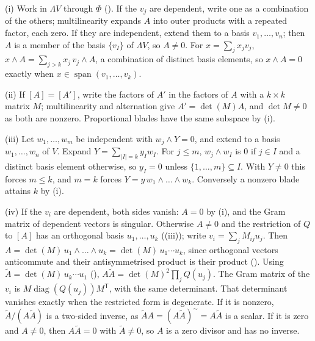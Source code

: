 (i) Work in $\Lambda V$ through $\Phi$ (). If the $v_j$ are dependent, write one as a combination of the others; multilinearity expands $A$ into outer products with a repeated factor, each zero. If they are independent, extend them to a basis $v_1, \dots, v_n$; then $A$ is a member of the basis $\{v_I\}$ of $\Lambda V$, so $A \ne 0$. For $x = \sum_j x_j v_j$, $x \wedge A = \sum_{j > k} x_j\, v_j \wedge A$, a combination of distinct basis elements, so $x \wedge A = 0$ exactly when $x \in \operatorname{span}(v_1, \dots, v_k)$.

(ii) If $[A] = [A']$, write the factors of $A'$ in the factors of $A$ with a $k \times k$ matrix $M$; multilinearity and alternation give $A' = \det(M) A$, and $\det M \ne 0$ as both are nonzero. Proportional blades have the same subspace by (i).

(iii) Let $w_1, \dots, w_m$ be independent with $w_j \wedge Y = 0$, and extend to a basis $w_1, \dots, w_n$ of $V$. Expand $Y = \sum_{|I| = k} y_I w_I$. For $j \le m$, $w_j \wedge w_I$ is $0$ if $j \in I$ and a distinct basis element otherwise, so $y_I = 0$ unless $\{1, \dots, m\} \subseteq I$. With $Y \ne 0$ this forces $m \le k$, and $m = k$ forces $Y = y\, w_1 \wedge \dots \wedge w_k$. Conversely a nonzero blade attains $k$ by (i).

(iv) If the $v_i$ are dependent, both sides vanish: $A = 0$ by (i), and the Gram matrix of dependent vectors is singular. Otherwise $A \ne 0$ and the restriction of $Q$ to $[A]$ has an orthogonal basis $u_1, \dots, u_k$ ((iii)); write $v_i = \sum_j M_{ij} u_j$. Then $A = \det(M)\, u_1 \wedge \dots \wedge u_k = \det(M)\, u_1 \cdots u_k$, since orthogonal vectors anticommute and their antisymmetrised product is their product (). Using $\tilde{A} = \det(M)\, u_k \cdots u_1$ (), $A \tilde{A} = \det(M)^{2} \prod_j Q(u_j)$. The Gram matrix of the $v_i$ is $M \operatorname{diag}(Q(u_j)) M^{\mathsf T}$, with the same determinant. That determinant vanishes exactly when the restricted form is degenerate. If it is nonzero, $\tilde{A}/(A\tilde{A})$ is a two-sided inverse, as $\tilde{A} A = (A \tilde{A})^{\sim} = A\tilde{A}$ is a scalar. If it is zero and $A \ne 0$, then $A \tilde{A} = 0$ with $\tilde{A} \ne 0$, so $A$ is a zero divisor and has no inverse.
